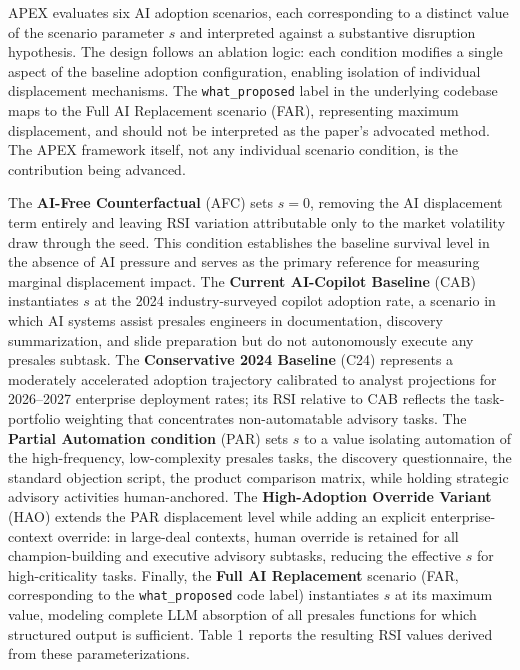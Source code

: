 \documentclass[10pt, conference]{IEEEtran}
\begin{document}
\label{sec:experimental_conditions_and_scenario_par}

APEX evaluates six AI adoption scenarios, each corresponding to a distinct value of the scenario parameter $s$ and interpreted against a substantive disruption hypothesis. The design follows an ablation logic: each condition modifies a single aspect of the baseline adoption configuration, enabling isolation of individual displacement mechanisms. The \texttt{what\_proposed} label in the underlying codebase maps to the Full AI Replacement scenario (FAR), representing maximum displacement, and should not be interpreted as the paper's advocated method. The APEX framework itself, not any individual scenario condition, is the contribution being advanced.

The \textbf{AI-Free Counterfactual} (AFC) sets $s = 0$, removing the AI displacement term entirely and leaving RSI variation attributable only to the market volatility draw through the seed. This condition establishes the baseline survival level in the absence of AI pressure and serves as the primary reference for measuring marginal displacement impact. The \textbf{Current AI-Copilot Baseline} (CAB) instantiates $s$ at the 2024 industry-surveyed copilot adoption rate, a scenario in which AI systems assist presales engineers in documentation, discovery summarization, and slide preparation but do not autonomously execute any presales subtask. The \textbf{Conservative 2024 Baseline} (C24) represents a moderately accelerated adoption trajectory calibrated to analyst projections for 2026--2027 enterprise deployment rates; its RSI relative to CAB reflects the task-portfolio weighting that concentrates non-automatable advisory tasks. The \textbf{Partial Automation condition} (PAR) sets $s$ to a value isolating automation of the high-frequency, low-complexity presales tasks, the discovery questionnaire, the standard objection script, the product comparison matrix, while holding strategic advisory activities human-anchored. The \textbf{High-Adoption Override Variant} (HAO) extends the PAR displacement level while adding an explicit enterprise-context override: in large-deal contexts, human override is retained for all champion-building and executive advisory subtasks, reducing the effective $s$ for high-criticality tasks. Finally, the \textbf{Full AI Replacement} scenario (FAR, corresponding to the \texttt{what\_proposed} code label) instantiates $s$ at its maximum value, modeling complete LLM absorption of all presales functions for which structured output is sufficient. Table 1 reports the resulting RSI values derived from these parameterizations.
\end{document}
